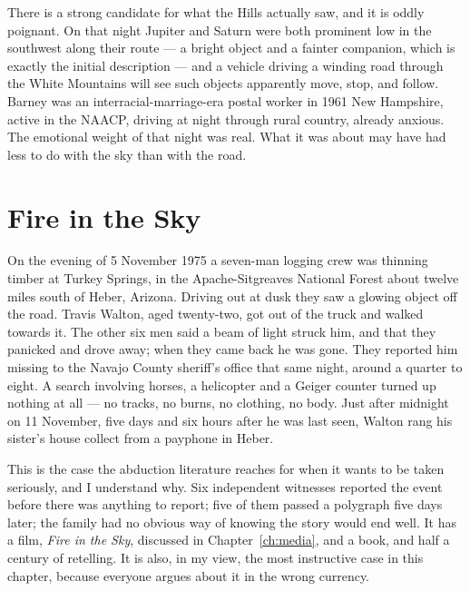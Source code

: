 \begin{funfact}
There is a strong candidate for what the Hills actually saw, and it is oddly poignant. On that
night Jupiter and Saturn were both prominent low in the southwest along their route --- a
bright object and a fainter companion, which is exactly the initial description --- and a
vehicle driving a winding road through the White Mountains will see such objects apparently
move, stop, and follow. Barney was an interracial-marriage-era postal worker in 1961 New
Hampshire, active in the NAACP, driving at night through rural country, already anxious. The
emotional weight of that night was real. What it was about may have had less to do with the
sky than with the road.
\end{funfact}

\section{Fire in the Sky}\label{sec:fireinthesky}

On the evening of 5 November 1975 a seven-man logging crew was thinning timber at Turkey
Springs, in the Apache-Sitgreaves National Forest about twelve miles south of Heber, Arizona.
Driving out at dusk they saw a glowing object off the road. Travis Walton, aged twenty-two,
got out of the truck and walked towards it. The other six men said a beam of light struck him,
and that they panicked and drove away; when they came back he was gone. They reported him
missing to the Navajo County sheriff's office that same night, around a quarter to eight. A
search involving horses, a helicopter and a Geiger counter turned up nothing at all --- no
tracks, no burns, no clothing, no body. Just after midnight on 11 November, five days and six
hours after he was last seen, Walton rang his sister's house collect from a payphone in Heber.

This is the case the abduction literature reaches for when it wants to be taken seriously, and
I understand why. Six independent witnesses reported the event before there was anything to
report; five of them passed a polygraph five days later; the family had no obvious way of
knowing the story would end well. It has a film, \emph{Fire in the Sky}, discussed in
Chapter~\ref{ch:media}, and a book, and half a century of retelling. It is also, in my view,
the most instructive case in this chapter, because everyone argues about it in the wrong
currency.

